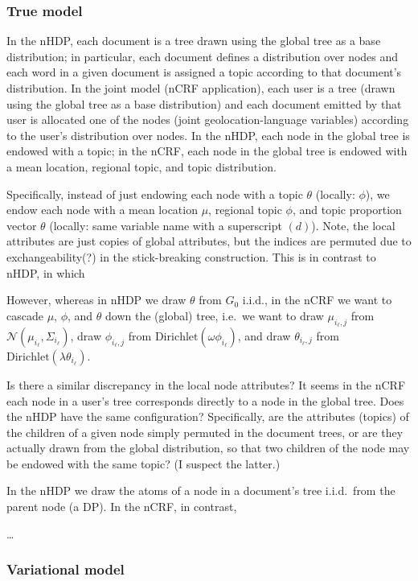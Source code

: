 \documentclass{article}
\newcommand{\Dirichlet}{\ensuremath{\mathrm{Dirichlet}}}
\newcommand{\Normal}{\ensuremath{\mathcal{N}}}
\begin{document}
\subsubsection*{True model}

In the nHDP, each document is a tree drawn using the global tree as a base distribution; in particular, each document defines a distribution over nodes and each word in a given document is assigned a topic according to that document's distribution.  In the joint model (nCRF application), each user is a tree (drawn using the global tree as a base distribution) and each document emitted by that user is allocated one of the nodes (joint geolocation-language variables) according to the user's distribution over nodes.  In the nHDP, each node in the global tree is endowed with a topic; in the nCRF, each node in the global tree is endowed with a mean location, regional topic, and topic distribution.

Specifically, instead of just endowing each node with a topic $\theta$ (locally: $\phi$), we endow each node with a mean location $\mu$, regional topic $\phi$, and topic proportion vector $\theta$ (locally: same variable name with a superscript $(d)$).  Note, the local attributes are just copies of global attributes, but the indices are permuted due to exchangeability(?) in the stick-breaking construction.  This is in contrast to nHDP, in which

However, whereas in nHDP we draw $\theta$ from $G_0$ i.i.d., in the nCRF we want to cascade $\mu$, $\phi$, and $\theta$ down the (global) tree, i.e.\ we want to draw $\mu_{i_\ell,j}$ from $\Normal(\mu_{i_\ell}, \Sigma_{i_\ell})$, draw $\phi_{i_\ell,j}$ from $\Dirichlet(\omega \phi_{i_\ell})$, and draw $\theta_{i_\ell,j}$ from $\Dirichlet(\lambda \theta_{i_\ell})$.

Is there a similar discrepancy in the local node attributes?  It seems in the nCRF each node in a user's tree corresponds directly to a node in the global tree.  Does the nHDP have the same configuration?  Specifically, are the attributes (topics) of the children of a given node simply permuted in the document trees, or are they actually drawn from the global distribution, so that two children of the node may be endowed with the same topic?  (I suspect the latter.)

In the nHDP we draw the atoms of a node in a document's tree i.i.d.\ from the parent node (a DP).  In the nCRF, in contrast,

\ldots


\subsubsection*{Variational model}





\end{document}
